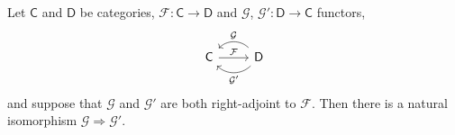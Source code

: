 \documentclass[main.tex]{subfiles}
\begin{document}
\begin{lemma}
  Let $\mathsf{C}$ and $\mathsf{D}$ be categories, $\mathcal{F}\colon \mathsf{C} \rightarrow \mathsf{D}$ and $\mathcal{G}$, $\mathcal{G}'\colon \mathsf{D} \rightarrow \mathsf{C}$ functors,
  \begin{equation*}
    \begin{tikzcd}
      \mathsf{C}
      \arrow[r, rightarrow, "\mathcal{F}"]
      & \mathsf{D}
      \arrow[l, rightarrow, bend right=45, swap, "\mathcal{G}"]
      \arrow[l, rightarrow, bend left=45, "\mathcal{G}'"]
    \end{tikzcd}
  \end{equation*}
  and suppose that $\mathcal{G}$ and $\mathcal{G}'$ are both right-adjoint to $\mathcal{F}$. Then there is a natural isomorphism $\mathcal{G} \Rightarrow \mathcal{G}'$.
\end{lemma}
\end{document}

